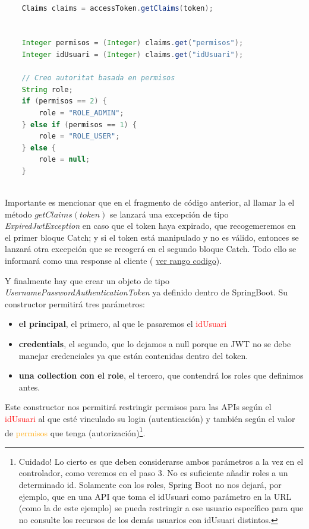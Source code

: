 \documentclass[a4paper,12pt]{report}
\begin{document}
		  
		  
		  \begin{lstlisting}[language=Java, basicstyle=\ttfamily\footnotesize, keywordstyle=\color{magenta}]
		  
	Claims claims = accessToken.getClaims(token);
	
	
	Integer permisos = (Integer) claims.get("permisos"); 
	Integer idUsuari = (Integer) claims.get("idUsuari"); 
	
	// Creo autoritat basada en permisos
	String role;
	if (permisos == 2) {
	  	role = "ROLE_ADMIN";
	} else if (permisos == 1) {
	  	role = "ROLE_USER";
	} else {
	  	role = null;
	}
		  
		  \end{lstlisting}
		  
		  Importante es mencionar que en el fragmento de código anterior, al llamar la el método $getClaims(token)$  se lanzará una excepción de tipo \textit{ExpiredJwtException} en caso que el token haya expirado, que recogemeremos en el primer bloque Catch; y si el token está manipulado y no es válido, entonces se lanzará otra excepción que se recogerá en el segundo bloque Catch. Todo ello se informará como una response al cliente ( \href{https://github.com/blackcub3s/mercApp/blob/89efcf854d8bbab2addde3f7e817eb97f7737b95/APP%20WEB/__springboot__produccio__/app/src/main/java/miApp/app/seguretat/FiltreAutenticacioJwt.java#L96-L115}{ver rango codigo}).
		  
		  
		  Y finalmente hay que crear un objeto de tipo \textit{UsernamePasswordAuthenticationToken} ya definido dentro de SpringBoot. Su constructor permitirá tres parámetros: 
		 
		 	\begin{itemize}
		 	\setlength{\itemsep}{-.5em}

			  \item \textbf{el principal}, el primero, al que le pasaremos el \textcolor{red}{idUsuari}
			 \item  \textbf{credentials}, el segundo, que lo dejamos a null porque en JWT no se debe manejar credenciales ya que están contenidas dentro del token. 
			  \item \textbf{una collection con el role}, el tercero, que contendrá los roles que definimos antes. 
		  \end{itemize}
		  Este constructor nos permitirá restringir permisos para las APIs según el \textcolor{red}{idUsuari} al que esté vinculado su login (autenticación) y también según el valor de \textcolor{orange}{permisos} que tenga (autorización)\footnote{Cuidado! Lo cierto es que deben considerarse ambos parámetros a la vez en el controlador, como veremos en el paso 3. No es suficiente añadir roles a un determinado id. Solamente con los roles, Spring Boot no nos dejará, por ejemplo, que en una API que toma el idUsuari como parámetro en la URL (como la de este ejemplo) se pueda restringir a ese usuario específico para que no consulte los recursos de los demás usuarios con idUsuari distintos.}.
		  
\end{document}
